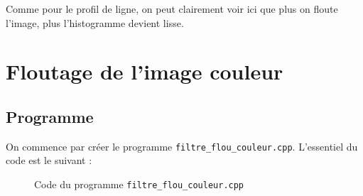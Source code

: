 \documentclass[french,a4paper,10pt]{article}
\begin{document}
    Comme pour le profil de ligne, on peut clairement voir ici que plus on floute l'image, plus l'histogramme devient
    lisse.

    \newpage
    \section{Floutage de l'image couleur}\label{sec:5}

    \subsection{Programme}\label{subsec:5.1}

    On commence par créer le programme \texttt{filtre\_flou\_couleur.cpp}.
    L'essentiel du code est le suivant :
    \begin{figure}[!htb]
        \centering
        \caption{Code du programme \texttt{filtre\_flou\_couleur.cpp}}\label{Fig:code-filtre-flou-couleur}
    \end{figure}
\end{document}
